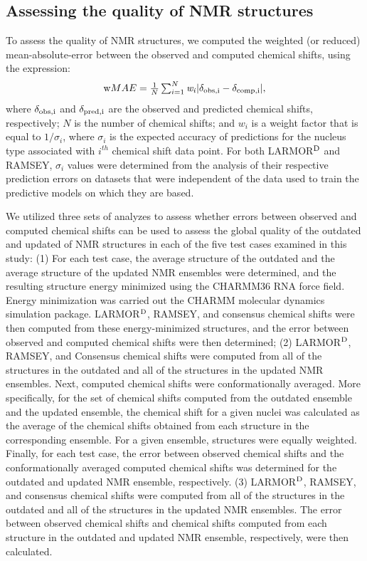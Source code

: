 \documentclass[fleqn,10pt]{wlscirep}
\begin{document}
\subsection*{Assessing the quality of NMR structures} 
To assess the quality of NMR structures, we computed the weighted (or reduced) mean-absolute-error between the observed and computed chemical shifts, using the expression:
\begin{equation}\label{eq:Q} 
$w$MAE = \frac{1}{N} \sum_{i=1}^{N} \mathit{w_{i}} | \delta_{\rm obs,i} - \delta_{\rm comp,i} |,
\end{equation}
where $\delta_{\rm obs,i}$ and $\delta_{\rm pred,i}$ are the observed and predicted chemical shifts, respectively; $N$ is the number of chemical shifts; and $w_{i}$ is a weight factor that is equal to $1/\sigma_{i}$, where $\sigma_{i}$ is the expected accuracy of predictions for the nucleus type associated with $i^{th}$ chemical shift data point. For both LARMOR$^{\rm D}$ and RAMSEY, $\sigma_{i}$ values were determined from the analysis of their respective prediction errors on datasets that were independent of the data used to train the predictive models on which they are based. 

We utilized three sets of analyzes to assess whether errors between observed and computed chemical shifts can be used to assess the global quality of the outdated and updated of NMR structures in each of the five test cases examined in this study: (1) For each test case, the average structure of the outdated and the average structure of the updated NMR ensembles were determined, and the resulting structure energy minimized using the CHARMM36 RNA force field. Energy minimization was carried out the CHARMM molecular dynamics simulation package. LARMOR$^{\rm D}$, RAMSEY, and consensus chemical shifts were then computed from these energy-minimized structures, and the error between observed and computed chemical shifts were then determined; (2) LARMOR$^{\rm D}$, RAMSEY, and Consensus chemical shifts were computed from all of the structures in the outdated and all of the structures in the updated NMR ensembles. Next, computed chemical shifts were conformationally averaged. More specifically, for the set of chemical shifts computed from the outdated ensemble and the updated ensemble, the chemical shift for a given nuclei was calculated as the average of the chemical shifts obtained from each structure in the corresponding ensemble. For a given ensemble, structures were equally weighted. Finally, for each test case, the error between observed chemical shifts and the conformationally averaged computed chemical shifts was determined for the outdated and updated NMR ensemble, respectively. (3) LARMOR$^{\rm D}$, RAMSEY, and consensus chemical shifts were computed from all of the structures in the outdated and all of the structures in the updated NMR ensembles.  The error between observed chemical shifts and chemical shifts computed from each structure in the outdated and updated NMR ensemble, respectively, were then calculated.
\end{document}
